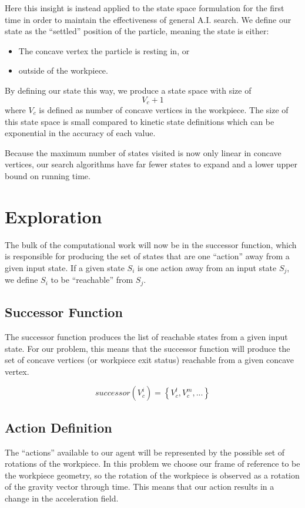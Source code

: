 Here this insight is instead applied to the state space formulation for the first time in order to maintain the effectiveness of general A.I. search. We define our state as the ``settled'' position of the particle, meaning the state is either:

\begin{itemize}
\item The concave vertex the particle is resting in, or
\item outside of the workpiece.
\end{itemize}

By defining our state this way, we produce a state space with size of
$$
V_{c} + 1
$$
where $V_{c}$ is defined as number of concave vertices in the workpiece. The size of this state space is small compared to kinetic state definitions which can be exponential in the accuracy of each value.

Because the maximum number of states visited is now only linear in concave vertices, our search algorithms have far fewer states to expand and a lower upper bound on running time.

\section{Exploration}

The bulk of the computational work will now be in the successor function, which is responsible for producing the set of states that are one ``action'' away from a given input state. If a given state $S_i$ is one action away from an input state $S_j$, we define $S_i$ to be ``reachable'' from $S_j$.

	\subsection{Successor Function}

The successor function produces the list of reachable states from a given input state. For our problem, this means that the successor function will produce the set of concave vertices (or workpiece exit status) reachable from a given concave vertex.

$$
successor(V_{c}^{i}) = \left \{ V_{c}^{l}, V_{c}^{m}, ...  \right \}
$$

	\subsection{Action Definition}

The ``actions'' available to our agent will be represented by the possible set of rotations of the workpiece. In this problem we choose our frame of reference to be the workpiece geometry, so the rotation of the workpiece is observed as a rotation of the gravity vector through time. This means that our action results in a change in the acceleration field.

